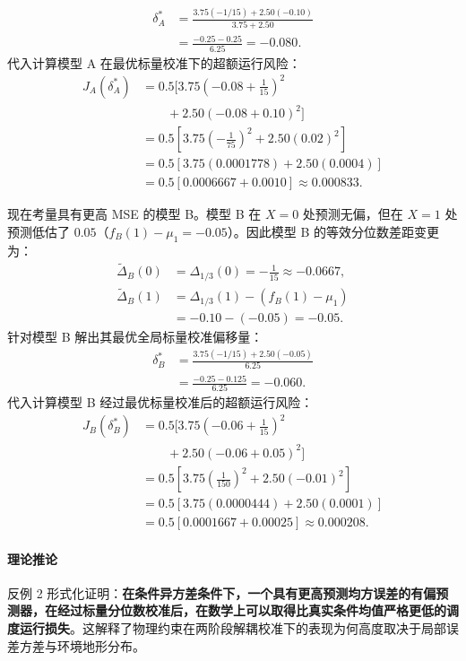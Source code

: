 \begin{align}
\delta_A^* &= \frac{3.75(-1/15) + 2.50(-0.10)}{3.75 + 2.50} \nonumber \\
&= \frac{-0.25 - 0.25}{6.25} = -0.080.
\end{align}
代入计算模型 A 在最优标量校准下的超额运行风险：
\begin{align}
J_A(\delta_A^*) &= 0.5 \Big[ 3.75 \left(-0.08 + \frac{1}{15}\right)^2 \nonumber \\
&\qquad + 2.50 (-0.08 + 0.10)^2 \Big] \nonumber \\
&= 0.5 \left[ 3.75 \left(-\frac{1}{75}\right)^2 + 2.50 (0.02)^2 \right] \nonumber \\
&= 0.5 [ 3.75(0.0001778) + 2.50(0.0004) ] \nonumber \\
&= 0.5 [ 0.0006667 + 0.0010 ] \approx 0.000833.
\end{align}

现在考量具有更高 MSE 的模型 B。模型 B 在 $X=0$ 处预测无偏，但在 $X=1$ 处预测低估了 $0.05$（$f_B(1) - \mu_1 = -0.05$）。因此模型 B 的等效分位数差距变更为：
\begin{align}
\tilde{\Delta}_B(0) &= \Delta_{1/3}(0) = -\frac{1}{15} \approx -0.0667, \\
\tilde{\Delta}_B(1) &= \Delta_{1/3}(1) - (f_B(1) - \mu_1) \nonumber \\
&= -0.10 - (-0.05) = -0.05.
\end{align}
针对模型 B 解出其最优全局标量校准偏移量：
\begin{align}
\delta_B^* &= \frac{3.75(-1/15) + 2.50(-0.05)}{6.25} \nonumber \\
&= \frac{-0.25 - 0.125}{6.25} = -0.060.
\end{align}
代入计算模型 B 经过最优标量校准后的超额运行风险：
\begin{align}
J_B(\delta_B^*) &= 0.5 \Big[ 3.75 \left(-0.06 + \frac{1}{15}\right)^2 \nonumber \\
&\qquad + 2.50 (-0.06 + 0.05)^2 \Big] \nonumber \\
&= 0.5 \left[ 3.75 \left(\frac{1}{150}\right)^2 + 2.50 (-0.01)^2 \right] \nonumber \\
&= 0.5 [ 3.75(0.0000444) + 2.50(0.0001) ] \nonumber \\
&= 0.5 [ 0.0001667 + 0.00025 ] \approx 0.000208.
\end{align}

\paragraph{理论推论}
反例 2 形式化证明：\textbf{在条件异方差条件下，一个具有更高预测均方误差的有偏预测器，在经过标量分位数校准后，在数学上可以取得比真实条件均值严格更低的调度运行损失}。这解释了物理约束在两阶段解耦校准下的表现为何高度取决于局部误差方差与环境地形分布。
